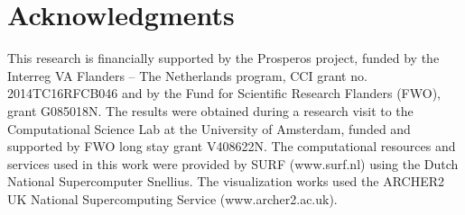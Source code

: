 \section{Acknowledgments}

This research is financially supported by the Prosperos project, funded by the Interreg VA Flanders – The Netherlands program, CCI grant no. 2014TC16RFCB046 and by the Fund for Scientific Research Flanders (FWO), grant G085018N. The results were obtained during a research visit to the Computational Science Lab at the University of Amsterdam, funded and supported by FWO long stay grant V408622N. The computational resources and services used in this work were provided by SURF (www.surf.nl) using the Dutch National Supercomputer Snellius. The visualization works used the ARCHER2 UK National Supercomputing Service (www.archer2.ac.uk).







\cleardoublepage
